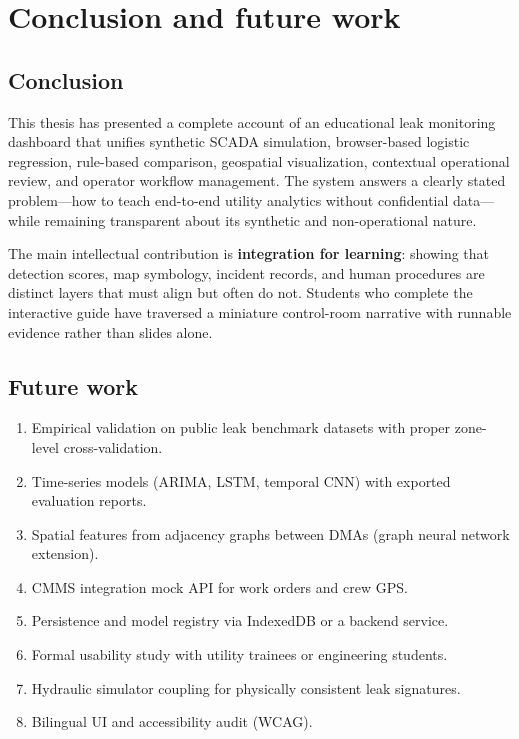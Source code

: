 \documentclass[12pt,a4paper]{article}
\begin{document}
\section{Conclusion and future work}
\label{sec:conclusion}

\subsection{Conclusion}

This thesis has presented a complete account of an educational leak monitoring dashboard that unifies synthetic SCADA simulation, browser-based logistic regression, rule-based comparison, geospatial visualization, contextual operational review, and operator workflow management. The system answers a clearly stated problem---how to teach end-to-end utility analytics without confidential data---while remaining transparent about its synthetic and non-operational nature.

The main intellectual contribution is \textbf{integration for learning}: showing that detection scores, map symbology, incident records, and human procedures are distinct layers that must align but often do not. Students who complete the interactive guide have traversed a miniature control-room narrative with runnable evidence rather than slides alone.

\subsection{Future work}

\begin{enumerate}
    \item Empirical validation on public leak benchmark datasets with proper zone-level cross-validation.
    \item Time-series models (ARIMA, LSTM, temporal CNN) with exported evaluation reports.
    \item Spatial features from adjacency graphs between DMAs (graph neural network extension).
    \item CMMS integration mock API for work orders and crew GPS.
    \item Persistence and model registry via IndexedDB or a backend service.
    \item Formal usability study with utility trainees or engineering students.
    \item Hydraulic simulator coupling for physically consistent leak signatures.
    \item Bilingual UI and accessibility audit (WCAG).
\end{enumerate}
\end{document}
